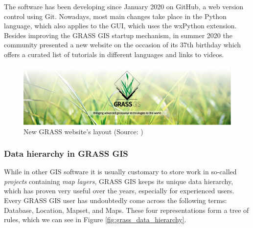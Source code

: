 \documentclass[a4paper,10pt,twoside]{article}
\begin{document}
The software has been developing since January 2020 on GitHub, a web version control using Git. Nowadays, most main changes take place in the Python language, which also applies to the GUI, which uses the wxPython extension. Besides improving the GRASS GIS startup mechanism, in summer 2020 the community presented a new website on the occasion of its 37th birthday which offers a curated list of tutorials in different languages and links to videos.

\vspace{0.7cm}
\begin{figure}[hbt!]
\begin{center}
\includegraphics[width=16cm]{../pictures/grass_gis.png} 
\caption[New GRASS website's layout]{New GRASS website's layout (Source: \cite{grass})}
\label{fig:grass_gis}
\end{center}
\end{figure}

\newpage
\vspace*{-1cm}
\subsubsection{Data hierarchy in GRASS GIS}
\label{subsection:hierarchy}
\noindent
\large

\noindent While in other GIS software it is usually customary to store work in so-called \textit{projects} containing \textit{map layers}, GRASS GIS keeps its unique data hierarchy, which has proven very useful over the years, especially for experienced users. Every GRASS GIS user has undoubtedly come across the following terms: Database, Location, Mapset, and Maps. These four representations form a tree of rules, which we can see in Figure \ref{fig:grass_data_hierarchy}.
\end{document}
